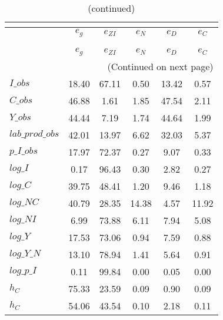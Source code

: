  
\begin{center}
\begin{longtable}{lccccc} 
\caption{Posterior mean variance decomposition (in percent)}\\
 \label{Table:dsge_post_mean_var_decomp_uncond}\\
\toprule 
$                $	 & 	 $       {e_g}$	 & 	 $    {e_{ZI}}$	 & 	 $       {e_N}$	 & 	 $       {e_D}$	 & 	 $       {e_C}$\\
\midrule \endfirsthead 
\caption{(continued)}\\
 \toprule \\ 
$                $	 & 	 $       {e_g}$	 & 	 $    {e_{ZI}}$	 & 	 $       {e_N}$	 & 	 $       {e_D}$	 & 	 $       {e_C}$\\
\midrule \endhead 
\midrule \multicolumn{6}{r}{(Continued on next page)} \\ \bottomrule \endfoot 
\bottomrule \endlastfoot 
$I\_obs          $	 & 	       18.40	 & 	       67.11	 & 	        0.50	 & 	       13.42	 & 	        0.57 \\ 
$C\_obs          $	 & 	       46.88	 & 	        1.61	 & 	        1.85	 & 	       47.54	 & 	        2.11 \\ 
$Y\_obs          $	 & 	       44.44	 & 	        7.19	 & 	        1.74	 & 	       44.64	 & 	        1.99 \\ 
$lab\_prod\_obs  $	 & 	       42.01	 & 	       13.97	 & 	        6.62	 & 	       32.03	 & 	        5.37 \\ 
$p\_I\_obs       $	 & 	       17.97	 & 	       72.37	 & 	        0.27	 & 	        9.07	 & 	        0.33 \\ 
$log\_I          $	 & 	        0.17	 & 	       96.43	 & 	        0.30	 & 	        2.82	 & 	        0.27 \\ 
$log\_C          $	 & 	       39.75	 & 	       48.41	 & 	        1.20	 & 	        9.46	 & 	        1.18 \\ 
$log\_NC         $	 & 	       40.79	 & 	       28.35	 & 	       14.38	 & 	        4.57	 & 	       11.92 \\ 
$log\_NI         $	 & 	        6.99	 & 	       73.88	 & 	        6.11	 & 	        7.94	 & 	        5.08 \\ 
$log\_Y          $	 & 	       17.53	 & 	       73.06	 & 	        0.94	 & 	        7.59	 & 	        0.88 \\ 
$log\_Y\_N       $	 & 	       13.10	 & 	       78.94	 & 	        1.41	 & 	        5.64	 & 	        0.91 \\ 
$log\_p\_I       $	 & 	        0.11	 & 	       99.84	 & 	        0.00	 & 	        0.05	 & 	        0.00 \\ 
${h_C}           $	 & 	       75.33	 & 	       23.59	 & 	        0.09	 & 	        0.90	 & 	        0.09 \\ 
${h_C}           $	 & 	       54.06	 & 	       43.54	 & 	        0.10	 & 	        2.18	 & 	        0.11 \\ 
\end{longtable}
 \end{center}
